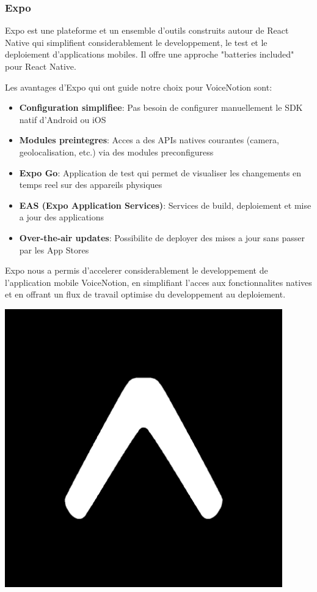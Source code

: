 \subsubsection{Expo}
\begin{minipage}{0.7\textwidth}
Expo est une plateforme et un ensemble d'outils construits autour de React Native qui simplifient considerablement le developpement, le test et le deploiement d'applications mobiles. Il offre une approche "batteries included" pour React Native.

Les avantages d'Expo qui ont guide notre choix pour VoiceNotion sont:

\begin{itemize}
    \item \textbf{Configuration simplifiee}: Pas besoin de configurer manuellement le SDK natif d'Android ou iOS
    \item \textbf{Modules preintegres}: Acces a des APIs natives courantes (camera, geolocalisation, etc.) via des modules preconfiguress
    \item \textbf{Expo Go}: Application de test qui permet de visualiser les changements en temps reel sur des appareils physiques
    \item \textbf{EAS (Expo Application Services)}: Services de build, deploiement et mise a jour des applications
    \item \textbf{Over-the-air updates}: Possibilite de deployer des mises a jour sans passer par les App Stores
\end{itemize}

Expo nous a permis d'accelerer considerablement le developpement de l'application mobile VoiceNotion, en simplifiant l'acces aux fonctionnalites natives et en offrant un flux de travail optimise du developpement au deploiement.
\end{minipage}%
\hfill
\begin{minipage}{0.25\textwidth}
\centering
\includegraphics[width=0.9\textwidth]{assets/docs/logo_expo.png}
\end{minipage}

